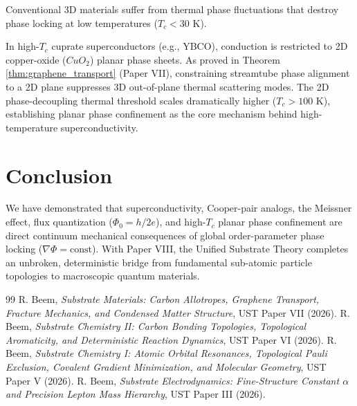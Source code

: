 \documentclass[11pt,a4paper]{article}
\begin{document}
	Conventional 3D materials suffer from thermal phase fluctuations that destroy phase locking at low temperatures ($T_c < 30 \text{ K}$).
	
	In high-$T_c$ cuprate superconductors (e.g., YBCO), conduction is restricted to 2D copper-oxide ($CuO_2$) planar phase sheets. As proved in Theorem \ref{thm:graphene_transport} (Paper VII), constraining streamtube phase alignment to a 2D plane suppresses 3D out-of-plane thermal scattering modes. The 2D phase-decoupling thermal threshold scales dramatically higher ($T_c > 100 \text{ K}$), establishing planar phase confinement as the core mechanism behind high-temperature superconductivity.
	
	\section{Conclusion}
	\label{sec:conclusion}
	
	We have demonstrated that superconductivity, Cooper-pair analogs, the Meissner effect, flux quantization ($\Phi_0 = h/2e$), and high-$T_c$ planar phase confinement are direct continuum mechanical consequences of global order-parameter phase locking ($\nabla \Phi = \text{const}$). With Paper VIII, the Unified Substrate Theory completes an unbroken, deterministic bridge from fundamental sub-atomic particle topologies to macroscopic quantum materials.
	
	\begin{thebibliography}{99}
		 R. Beem, \textit{Substrate Materials: Carbon Allotropes, Graphene Transport, Fracture Mechanics, and Condensed Matter Structure}, UST Paper VII (2026).
		 R. Beem, \textit{Substrate Chemistry II: Carbon Bonding Topologies, Topological Aromaticity, and Deterministic Reaction Dynamics}, UST Paper VI (2026).
		 R. Beem, \textit{Substrate Chemistry I: Atomic Orbital Resonances, Topological Pauli Exclusion, Covalent Gradient Minimization, and Molecular Geometry}, UST Paper V (2026).
		 R. Beem, \textit{Substrate Electrodynamics: Fine-Structure Constant $\alpha$ and Precision Lepton Mass Hierarchy}, UST Paper III (2026).
	\end{thebibliography}
	
\end{document}
